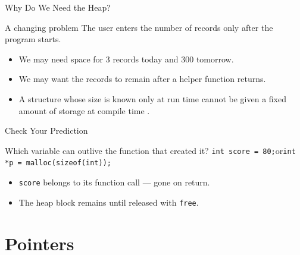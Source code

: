 \documentclass[aspectratio=169]{beamer}
\begin{document}
\begin{frame}{Why Do We Need the Heap?}
  \begin{block}{A changing problem}
    The user enters the number of records only after the program starts.
  \end{block}
  \begin{itemize}
    \item We may need space for 3 records today and 300 tomorrow.
    \item We may want the records to remain after a helper function returns.
    \item A structure whose size is known only at run time cannot be given a
      fixed amount of storage at compile time
      \cite{Wirth2004_algorithms_data_structures}.
  \end{itemize}
\end{frame}

\begin{frame}{Check Your Prediction}
  \begin{block}{Which variable can outlive the function that created it?}
    \texttt{int score = 80;}\hfill or\hfill \texttt{int *p = malloc(sizeof(int));}
  \end{block}
  \begin{itemize}
    \item \texttt{score} belongs to its function call --- gone on return.
    \item The heap block remains until released with \texttt{free}.
  \end{itemize}
\end{frame}


\section{Pointers}

\end{document}
